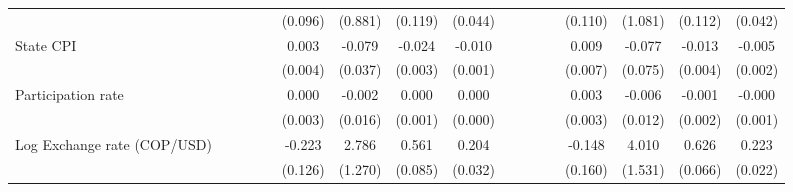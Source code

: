 \begin{tabular}{lcccccccccccccccc}
                    &                     &                     &                     &                     &     (0.096)         &     (0.881)         &     (0.119)         &     (0.044)         &                     &                     &                     &                     &     (0.110)         &     (1.081)         &     (0.112)         &     (0.042)         \\
\addlinespace
State CPI           &                     &                     &                     &                     &       0.003         &      -0.079\sym{*}  &      -0.024\sym{***}&      -0.010\sym{***}&                     &                     &                     &                     &       0.009         &      -0.077         &      -0.013\sym{**} &      -0.005\sym{**} \\
                    &                     &                     &                     &                     &     (0.004)         &     (0.037)         &     (0.003)         &     (0.001)         &                     &                     &                     &                     &     (0.007)         &     (0.075)         &     (0.004)         &     (0.002)         \\
\addlinespace
Participation rate  &                     &                     &                     &                     &       0.000         &      -0.002         &       0.000         &       0.000         &                     &                     &                     &                     &       0.003         &      -0.006         &      -0.001         &      -0.000         \\
                    &                     &                     &                     &                     &     (0.003)         &     (0.016)         &     (0.001)         &     (0.000)         &                     &                     &                     &                     &     (0.003)         &     (0.012)         &     (0.002)         &     (0.001)         \\
\addlinespace
Log Exchange rate (COP/USD)&                     &                     &                     &                     &      -0.223         &       2.786\sym{*}  &       0.561\sym{***}&       0.204\sym{***}&                     &                     &                     &                     &      -0.148         &       4.010\sym{**} &       0.626\sym{***}&       0.223\sym{***}\\
                    &                     &                     &                     &                     &     (0.126)         &     (1.270)         &     (0.085)         &     (0.032)         &                     &                     &                     &                     &     (0.160)         &     (1.531)         &     (0.066)         &     (0.022)         \\

\end{tabular}
